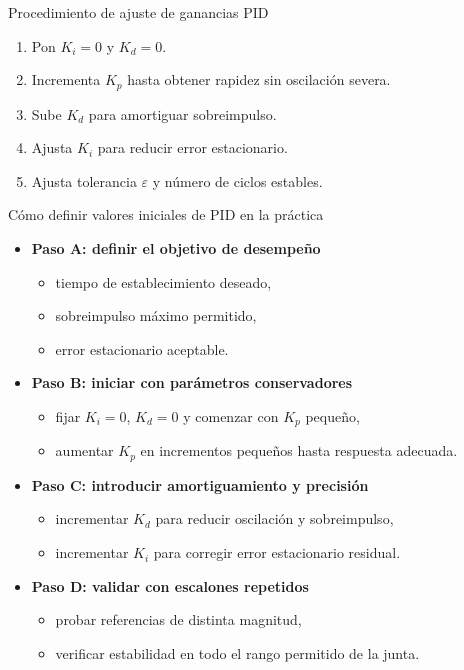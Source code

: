 \documentclass[aspectratio=169]{beamer}
\begin{document}
\begin{frame}{Procedimiento de ajuste de ganancias PID}
\begin{enumerate}
  \item Pon $K_i=0$ y $K_d=0$.
  \item Incrementa $K_p$ hasta obtener rapidez sin oscilación severa.
  \item Sube $K_d$ para amortiguar sobreimpulso.
  \item Ajusta $K_i$ para reducir error estacionario.
  \item Ajusta tolerancia $\varepsilon$ y número de ciclos estables.
\end{enumerate}
\end{frame}

\begin{frame}{Cómo definir valores iniciales de PID en la práctica}
\begin{itemize}
  \item \textbf{Paso A: definir el objetivo de desempeño}
  \begin{itemize}
    \item tiempo de establecimiento deseado,
    \item sobreimpulso máximo permitido,
    \item error estacionario aceptable.
  \end{itemize}
  \item \textbf{Paso B: iniciar con parámetros conservadores}
  \begin{itemize}
    \item fijar $K_i=0$, $K_d=0$ y comenzar con $K_p$ pequeño,
    \item aumentar $K_p$ en incrementos pequeños hasta respuesta adecuada.
  \end{itemize}
  \item \textbf{Paso C: introducir amortiguamiento y precisión}
  \begin{itemize}
    \item incrementar $K_d$ para reducir oscilación y sobreimpulso,
    \item incrementar $K_i$ para corregir error estacionario residual.
  \end{itemize}
  \item \textbf{Paso D: validar con escalones repetidos}
  \begin{itemize}
    \item probar referencias de distinta magnitud,
    \item verificar estabilidad en todo el rango permitido de la junta.
  \end{itemize}
\end{itemize}
\end{frame}
\end{document}

